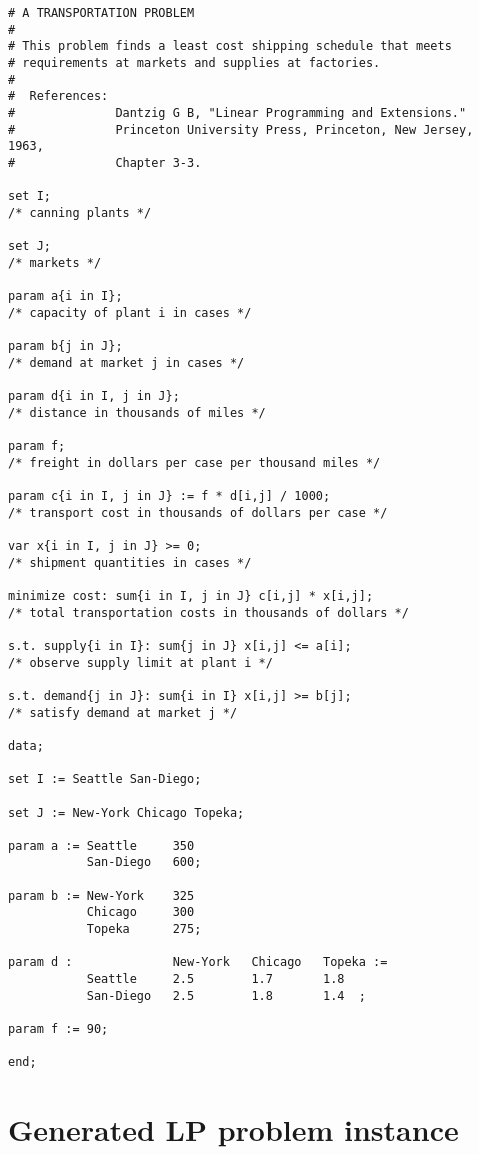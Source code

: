 \documentclass[11pt]{report}
\begin{document}
\bigskip

\begin{verbatim}
# A TRANSPORTATION PROBLEM
#
# This problem finds a least cost shipping schedule that meets
# requirements at markets and supplies at factories.
#
#  References:
#              Dantzig G B, "Linear Programming and Extensions."
#              Princeton University Press, Princeton, New Jersey, 1963,
#              Chapter 3-3.

set I;
/* canning plants */

set J;
/* markets */

param a{i in I};
/* capacity of plant i in cases */

param b{j in J};
/* demand at market j in cases */

param d{i in I, j in J};
/* distance in thousands of miles */

param f;
/* freight in dollars per case per thousand miles */

param c{i in I, j in J} := f * d[i,j] / 1000;
/* transport cost in thousands of dollars per case */

var x{i in I, j in J} >= 0;
/* shipment quantities in cases */

minimize cost: sum{i in I, j in J} c[i,j] * x[i,j];
/* total transportation costs in thousands of dollars */

s.t. supply{i in I}: sum{j in J} x[i,j] <= a[i];
/* observe supply limit at plant i */

s.t. demand{j in J}: sum{i in I} x[i,j] >= b[j];
/* satisfy demand at market j */

data;

set I := Seattle San-Diego;

set J := New-York Chicago Topeka;

param a := Seattle     350
           San-Diego   600;

param b := New-York    325
           Chicago     300
           Topeka      275;

param d :              New-York   Chicago   Topeka :=
           Seattle     2.5        1.7       1.8
           San-Diego   2.5        1.8       1.4  ;

param f := 90;

end;
\end{verbatim}

\newpage

\section{Generated LP problem instance}
\end{document}
